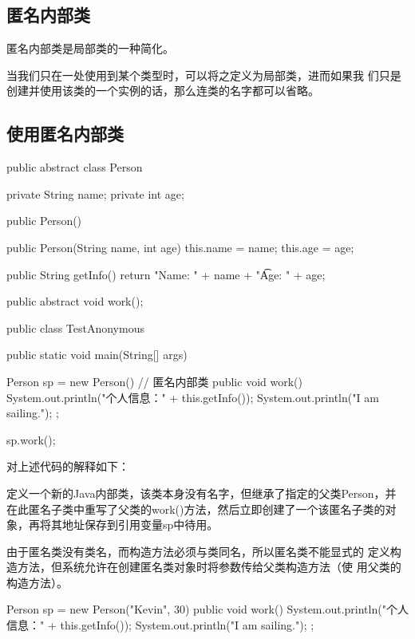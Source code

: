 
\subsection{匿名内部类}

匿名内部类是局部类的一种简化。

{\kai 当我们只在一处使用到某个类型时，可以将之定义为局部类，进而如果我
  们只是创建并使用该类的一个实例的话，那么连类的名字都可以省略。}

\subsection{使用匿名内部类}


\begin{javaCode}
  public abstract class Person {
    private String name;
    private int age;
    
    public Person() {}
    
    public Person(String name, int age) {
      this.name = name;
      this.age = age;
    }
    
    public String getInfo() {
      return "Name: " + name + "\t Age: " + age;
    }
    
    public abstract void work();
  }  
\end{javaCode}


\begin{javaCode}
  public class TestAnonymous {
    public static void main(String[] args) {
      Person sp = new Person() { // 匿名内部类
        public void work() {
          System.out.println("个人信息：" + this.getInfo());
          System.out.println("I am sailing.");
        }
      };
      
      sp.work();
    }
  }
\end{javaCode}

对上述代码的解释如下：

{\kai 定义一个新的Java内部类，该类本身没有名字，但继承了指定的父类Person，并
在此匿名子类中重写了父类的work()方法，然后立即创建了一个该匿名子类的对
象，再将其地址保存到引用变量sp中待用。}


由于匿名类没有类名，而构造方法必须与类同名，所以{\hei 匿名类不能显式的
  定义构造方法}，但系统允许在创建匿名类对象时将参数传给父类构造方法（使
用父类的构造方法）。

\begin{javaCode}
  Person sp = new Person("Kevin", 30) {
    public void work() {
      System.out.println("个人信息：" + this.getInfo());
      System.out.println("I am sailing.");
    }
  };
\end{javaCode}

